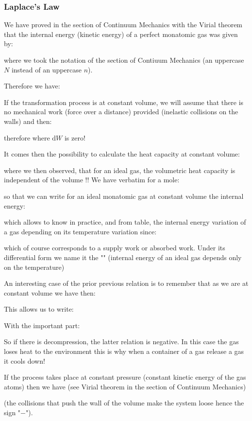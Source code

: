 	\subsubsection{Laplace's Law}
	We have proved in the section of Continuum Mechanics with the Virial theorem that the internal energy (kinetic energy) of a perfect monatomic gas was given by:
	
	where we took the notation of the section of Contiuum Mechanics (an uppercase $N$ instead of an uppercase $n$).

	Therefore we have:
	
	If the transformation process is at constant volume, we will assume that there is no mechanical work (force over a distance) provided (inelastic collisions on the walls) and then:
	
	therefore where $\mathrm{d}W$ is zero!

	It comes then the possibility to calculate the heat capacity at constant volume:
	
	where we then observed, that for an ideal gas, the volumetric heat capacity is independent of the volume !! We have verbatim for a mole:
	
	so that we can write for an ideal monatomic gas at constant volume the internal energy:
	
	which allows to know in practice, and from table, the internal energy variation of a gas depending on its temperature variation since:
	
	which of course corresponds to a supply work or absorbed work. Under its differential form we name it the "" (internal energy of an ideal gas depends only on the temperature)
	
	An interesting case of the prior previous relation is to remember that as we are at constant volume we have then:
	
	This allows us to write:
	
	With the important part:
	
	So if there is decompression, the latter relation is negative. In this case the gas loses heat to the environment this is why when a container of a gas release a gas it cools down!

	If the process takes place at constant pressure (constant kinetic energy of the gas atoms) then we have (see Virial theorem  in the section of Continuum Mechanics)
	
	(the collisions that push the wall of the volume make the system loose hence the sign "$-$").

